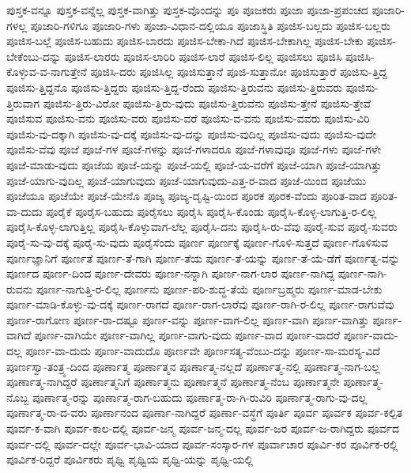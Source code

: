 {ಪುಸ್ತಕ-ವನ್ನೂ
ಪುಸ್ತಕ-ವನ್ನೆಲ್ಲ
ಪುಸ್ತಕ-ವಾಗಿತ್ತು
ಪುಸ್ತಕ-ವೊಂದನ್ನು
ಪೂ
ಪೂಜಕರು
ಪೂಜಾ
ಪೂಜಾ-ಪ್ರಪಂಚದ
ಪೂಜಾರಿ-ಗಳಲ್ಲ
ಪೂಜಾರಿ-ಗಳಿಗೂ
ಪೂಜಾರಿ-ಗಳು
ಪೂಜಾ-ವಿಧಾನ-ದಲ್ಲಿಯೂ
ಪೂಜಾಸ್ಥಿತಿ
ಪೂಜಿಸ-ಬಲ್ಲದು
ಪೂಜಿಸ-ಬಲ್ಲರು
ಪೂಜಿಸ-ಬಲ್ಲೆ
ಪೂಜಿಸ-ಬಹುದು
ಪೂಜಿಸ-ಬಾರದು
ಪೂಜಿಸ-ಬೇಕಾ-ಗಿದೆ
ಪೂಜಿಸ-ಬೇಕಾಗಿಲ್ಲ
ಪೂಜಿಸ-ಬೇಕು
ಪೂಜಿಸ-ಬೇಕೆಂಬು-ದನ್ನು
ಪೂಜಿಸ-ಲಾರರು
ಪೂಜಿಸ-ಲಾರಿರಿ
ಪೂಜಿಸ-ಲಾರೆ
ಪೂಜಿಸ-ಲಿಲ್ಲ
ಪೂಜಿಸಲು
ಪೂಜಿಸಿ
ಪೂಜಿಸಿ-ಕೊಳ್ಳುವ-ವ-ನಾಗುತ್ತೇನೆ
ಪೂಜಿಸಿ-ದರು
ಪೂಜಿಸಿಲ್ಲ
ಪೂಜಿಸುತ್ತಾನೆ
ಪೂಜಿ-ಸುತ್ತಾನೋ
ಪೂಜಿಸುತ್ತಾರೆ
ಪೂಜಿಸು-ತ್ತಿದ್ದ
ಪೂಜಿಸು-ತ್ತಿದ್ದನೊ
ಪೂಜಿಸು-ತ್ತಿದ್ದರು
ಪೂಜಿಸು-ತ್ತಿದ್ದ-ರೆಂದು
ಪೂಜಿಸು-ತ್ತಿರುವನು
ಪೂಜಿಸು-ತ್ತಿರುವರು
ಪೂಜಿಸು-ತ್ತಿರುವಾಗ
ಪೂಜಿಸು-ತ್ತಿರು-ವಿರೋ
ಪೂಜಿಸು-ತ್ತಿರು-ವುದು
ಪೂಜಿಸು-ತ್ತಿರುವೆನು
ಪೂಜಿಸು-ತ್ತೇನೆ
ಪೂಜಿಸು-ತ್ತೇವೆ
ಪೂಜಿಸುವ
ಪೂಜಿಸು-ವನು
ಪೂಜಿಸು-ವರು
ಪೂಜಿಸು-ವರೆ
ಪೂಜಿಸು-ವ-ವನು
ಪೂಜಿಸು-ವವರು
ಪೂಜಿಸು-ವಿರಿ
ಪೂಜಿಸು-ವು-ದಕ್ಕಾಗಿ
ಪೂಜಿಸು-ವು-ದಕ್ಕೆ
ಪೂಜಿಸು-ವು-ದನ್ನು
ಪೂಜಿಸು-ವುದಿಲ್ಲ
ಪೂಜಿಸು-ವುದು
ಪೂಜಿಸು-ವುದೇ
ಪೂಜಿಸು-ವೆವು
ಪೂಜೆ
ಪೂಜೆ-ಗಳ
ಪೂಜೆ-ಗಳನ್ನು
ಪೂಜೆ-ಗಳಾದರೂ
ಪೂಜೆ-ಗಳಾವುವೂ
ಪೂಜೆ-ಗಳು
ಪೂಜೆ-ಗಳೇ
ಪೂಜೆ-ಮಾಡು-ವುದು
ಪೂಜೆಯ
ಪೂಜೆ-ಯನ್ನು
ಪೂಜೆ-ಯಲ್ಲಿ
ಪೂಜೆ-ಯ-ವರೆಗೆ
ಪೂಜೆ-ಯಾಗಿ
ಪೂಜೆ-ಯಾಗಿತ್ತು
ಪೂಜೆ-ಯಾಗು-ವುದಿಲ್ಲ
ಪೂಜೆ-ಯಾಗುವುದು
ಪೂಜೆ-ಯಾಗುವುದು-ಎತ್ತ-ರ-ವಾದ
ಪೂಜೆ-ಯಿಂದ
ಪೂಜೆಯು
ಪೂಜೆಯೂ
ಪೂಜೆಯೇ
ಪೂಜೆ-ಯೇನೊ
ಪೂಜ್ಯ
ಪೂಜ್ಯ-ದೃಷ್ಟಿ-ಯಿಂದ
ಪೂರಕ
ಪೂರಕ-ವೆಂದು
ಪೂರಿತ-ವಾದ
ಪೂರಿತ-ವಾ-ದುದು
ಪೂರೈಕೆ
ಪೂರೈಸ-ಬಹುದು
ಪೂರೈಸಲು
ಪೂರೈಸಿ
ಪೂರೈಸಿ-ಕೊಂಡು
ಪೂರೈಸಿ-ಕೊಳ್ಳ-ಲಾಗುತ್ತಿ-ರ-ಲಿಲ್ಲ
ಪೂರೈಸಿ-ಕೊಳ್ಳ-ಲಾಗುತ್ತಿಲ್ಲ
ಪೂರೈಸಿ-ಕೊಳ್ಳುವಾಗ-ಲೆಲ್ಲ
ಪೂರೈಸಿ-ದನು
ಪೂರೈಸಿ-ರು-ವೆವು
ಪೂರೈ-ಸುವ
ಪೂರೈ-ಸುವರು
ಪೂರೈ-ಸು-ವು-ದಕ್ಕೆ
ಪೂರೈ-ಸು-ವುದು
ಪೂರೈಸೆಂದು
ಪೂರ್ಣ
ಪೂರ್ಣಕ್ಕೆ
ಪೂರ್ಣ-ಗೊಳಿ-ಸುತ್ತದೆ
ಪೂರ್ಣ-ಗೊಳಿಸುವ
ಪೂರ್ಣಜ್ಞಾನಿಗೆ
ಪೂರ್ಣತೆ
ಪೂರ್ಣ-ತೆ-ಗಾಗಿ
ಪೂರ್ಣ-ತೆಯ
ಪೂರ್ಣ-ತೆ-ಯನ್ನು
ಪೂರ್ಣ-ತೆ-ಯೆ-ಡೆಗೆ
ಪೂರ್ಣತ್ವ-ವನ್ನು
ಪೂರ್ಣದ
ಪೂರ್ಣ-ದಿಂದ
ಪೂರ್ಣ-ದೇವರು
ಪೂರ್ಣ-ನನ್ನಾಗಿ
ಪೂರ್ಣ-ನಾಗ-ಲಾರ
ಪೂರ್ಣ-ನಾಗಿದ್ದ
ಪೂರ್ಣ-ನಾಗಿ-ರುವನು
ಪೂರ್ಣ-ನಾಗುತ್ತಿ-ರ-ಲಿಲ್ಲ
ಪೂರ್ಣನು
ಪೂರ್ಣ-ಪರಿ-ಶುದ್ಧ-ತೆಯೆ
ಪೂರ್ಣಬ್ರಹ್ಮರು
ಪೂರ್ಣ-ಮಾಡ-ಬೇಕು
ಪೂರ್ಣ-ಮಾಡಿ-ಕೊಳ್ಳು-ವು-ದಕ್ಕೆ
ಪೂರ್ಣ-ರಾಗದೆ
ಪೂರ್ಣ-ರಾಗ-ಲಾರೆವು
ಪೂರ್ಣ-ರಾಗಿ-ರ-ಲಿಲ್ಲ
ಪೂರ್ಣ-ರಾಗುವೆವು
ಪೂರ್ಣ-ರಾಗೋಣ
ಪೂರ್ಣ-ರಾ-ದಷ್ಟೂ
ಪೂರ್ಣ-ವನ್ನು
ಪೂರ್ಣ-ವಾಗ-ಲಿಲ್ಲ
ಪೂರ್ಣ-ವಾಗಿ
ಪೂರ್ಣ-ವಾಗಿತ್ತು
ಪೂರ್ಣ-ವಾಗಿದೆ
ಪೂರ್ಣ-ವಾಗಿಯೇ
ಪೂರ್ಣ-ವಾಗಿಲ್ಲ
ಪೂರ್ಣ-ವಾಗು-ವುದು
ಪೂರ್ಣ-ವಾದ
ಪೂರ್ಣ-ವಾದರೆ
ಪೂರ್ಣ-ವಾದು-ದಲ್ಲ
ಪೂರ್ಣ-ವಾ-ದುದು
ಪೂರ್ಣ-ವಾದುದೊ
ಪೂರ್ಣವೇ
ಪೂರ್ಣಸತ್ಯ-ವೆಂಬು-ದನ್ನು
ಪೂರ್ಣ-ಸಾ-ಮರಸ್ಯ-ವಿದೆ
ಪೂರ್ಣಸ್ವಾ-ತಂತ್ರ್ಯ-ದಿಂದ
ಪೂರ್ಣಾತ್ಮ
ಪೂರ್ಣಾತ್ಮನ
ಪೂರ್ಣಾತ್ಮ-ನಲ್ಲದೆ
ಪೂರ್ಣಾತ್ಮ-ನಲ್ಲಿ
ಪೂರ್ಣಾತ್ಮ-ನಾಗ-ಬಲ್ಲ
ಪೂರ್ಣಾತ್ಮ-ನಾಗಿದ್ದರೆ
ಪೂರ್ಣಾತ್ಮನಿಗೆ
ಪೂರ್ಣಾತ್ಮನು
ಪೂರ್ಣಾತ್ಮನೆ
ಪೂರ್ಣಾತ್ಮ-ನೆಂಬ
ಪೂರ್ಣಾತ್ಮನೇ
ಪೂರ್ಣಾತ್ಮ-ನೊಬ್ಬ
ಪೂರ್ಣಾತ್ಮ-ರನ್ನು
ಪೂರ್ಣಾತ್ಮ-ರಾಗ-ಬಹುದು
ಪೂರ್ಣಾತ್ಮ-ರಾ-ಗಿ-ರುವಿರಿ
ಪೂರ್ಣಾತ್ಮ-ರಾಗು-ವು-ದಲ್ಲ
ಪೂರ್ಣಾತ್ಮ-ರಾ-ದ-ವರು
ಪೂರ್ಣಾನಂದ
ಪೂರ್ಣಾ-ನಾಗಿದ್ದರೆ
ಪೂರ್ಣಾ-ವಸ್ಥೆಗೆ
ಪೂರ್ತಿ
ಪೂರ್ವ
ಪೂರ್ವಕ
ಪೂರ್ವ-ಕಲ್ಪಿತ
ಪೂರ್ವ-ಕ-ವಾಗಿ
ಪೂರ್ವ-ಕಾಲ-ದಲ್ಲಿ
ಪೂರ್ವ-ಜನ್ಮ
ಪೂರ್ವ-ಜನ್ಮ-ದಲ್ಲ
ಪೂರ್ವ-ಜರ
ಪೂರ್ವ-ಜ-ರಾಗಿದ್ದರು
ಪೂರ್ವದ
ಪೂರ್ವ-ದಲ್ಲಿ
ಪೂರ್ವ-ದಲ್ಲೇ
ಪೂರ್ವ-ಭಾವಿ-ಯಾದ
ಪೂರ್ವ-ಸಂಸ್ಕಾರ-ಗಳ
ಪೂರ್ವಾಚಾರ
ಪೂರ್ವಿ-ಕರ
ಪೂರ್ವಿಕ-ರಲ್ಲಿ
ಪೂರ್ವಿಕ-ರಿದ್ದರೆ
ಪೂರ್ವಿಕರು
ಪೃಥ್ವಿ
ಪೃಥ್ವಿಯ
ಪೃಥ್ವಿ-ಯನ್ನು
ಪೃಥ್ವಿ-ಯಲ್ಲಿ
}
